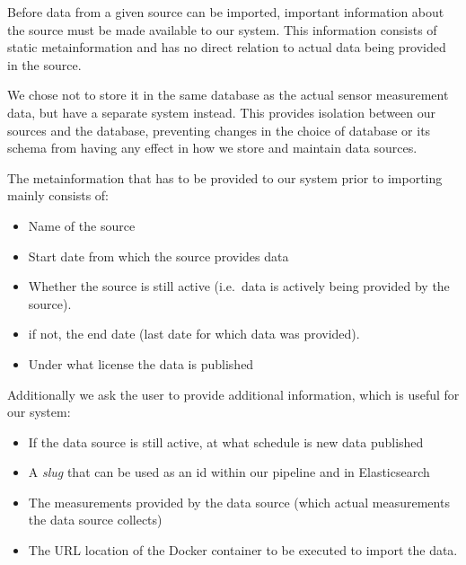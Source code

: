 Before data from a given source can be imported, important information
about the source must be made available to our system. This information
consists of static metainformation and has no direct relation to actual
data being provided in the source.

We chose not to store it in the same database as the actual sensor
measurement data, but have a separate system instead. This provides
isolation between our sources and the database, preventing changes in
the choice of database or its schema from having any effect in how we
store and maintain data sources.

The metainformation that has to be provided to our system prior to
importing mainly consists of:

\begin{itemize}
\tightlist
\item
  Name of the source
\item
  Start date from which the source provides data
\item
  Whether the source is still active (i.e.~data is actively being
  provided by the source).
\item
  if not, the end date (last date for which data was provided).
\item
  Under what license the data is published
\end{itemize}

Additionally we ask the user to provide additional information, which is
useful for our system:

\begin{itemize}
\tightlist
\item
  If the data source is still active, at what schedule is new data
  published
\item
  A \emph{slug} that can be used as an id within our pipeline and in
  Elasticsearch
\item
  The measurements provided by the data source (which actual
  measurements the data source collects)
\item
  The URL location of the Docker container to be executed to import the
  data.
\end{itemize}

